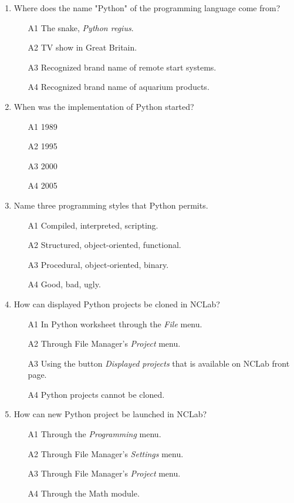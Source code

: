 \documentclass[article,A4,12pt]{llncs}
\begin{document}
\begin{enumerate}
\item Where does the name "Python" of the programming language come from?
\begin{enumerate}
\item[A1] The snake, {\em Python regius}.
\item[A2] TV show in Great Britain.
\item[A3] Recognized brand name of remote start systems.
\item[A4] Recognized brand name of aquarium products.
\end{enumerate}
\item When was the implementation of Python started?
\begin{enumerate}
\item[A1] 1989
\item[A2] 1995
\item[A3] 2000
\item[A4] 2005
\end{enumerate}
\item Name three programming styles that Python permits.
\begin{enumerate}
\item[A1] Compiled, interpreted, scripting.
\item[A2] Structured, object-oriented, functional.
\item[A3] Procedural, object-oriented, binary.
\item[A4] Good, bad, ugly.
\end{enumerate}
\item How can displayed Python projects be cloned in NCLab?
\begin{enumerate}
\item[A1] In Python worksheet through the {\em File} menu.
\item[A2] Through File Manager's {\em Project} menu.
\item[A3] Using the button {\em Displayed projects} that is available on NCLab front page.
\item[A4] Python projects cannot be cloned.
\end{enumerate}
\item How can new Python project be launched in NCLab?
\begin{enumerate}
\item[A1] Through the {\em Programming} menu.
\item[A2] Through File Manager's {\em Settings} menu.
\item[A3] Through File Manager's {\em Project} menu.
\item[A4] Through the Math module.

\end{enumerate}
\end{enumerate}
\end{document}
